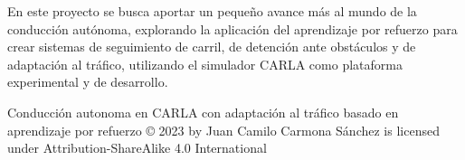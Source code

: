 En este proyecto se busca aportar un pequeño avance más al mundo de la conducción autónoma, explorando la aplicación del aprendizaje por refuerzo para crear sistemas de seguimiento de carril, de detención ante obstáculos y de adaptación al tráfico, utilizando el simulador CARLA como plataforma experimental y de desarrollo.

\bigskip
\bigskip
\bigskip
\bigskip
\bigskip
\bigskip
\bigskip
\bigskip
\bigskip
\bigskip
\bigskip
\bigskip
\bigskip
\bigskip

\bigskip
\bigskip
\bigskip
\bigskip
\bigskip
\bigskip
\bigskip
\bigskip
\bigskip
\bigskip
\bigskip
\bigskip
\bigskip
\bigskip

\bigskip
\bigskip
\bigskip
\bigskip
\bigskip
\bigskip
\bigskip
\bigskip
\bigskip
\bigskip
\bigskip
\bigskip
\bigskip
\bigskip
\bigskip
\bigskip
\bigskip
\bigskip
\bigskip
\bigskip
\bigskip
\bigskip
\bigskip
\bigskip
Conducción autonoma en CARLA con adaptación al tráfico basado en aprendizaje por refuerzo © 2023 by Juan Camilo Carmona Sánchez is licensed under Attribution-ShareAlike 4.0 International 


